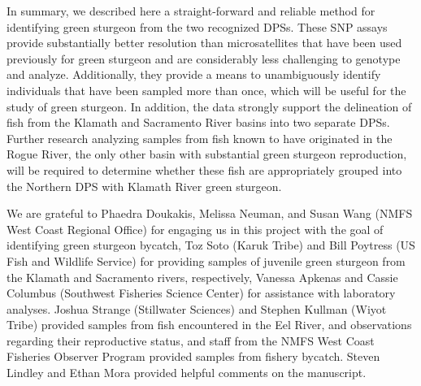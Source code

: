 In summary, we described here a straight-forward and reliable method for identifying
green sturgeon from the two recognized DPSs. These SNP assays provide substantially 
better resolution than microsatellites that have been used previously for green sturgeon \citep{Israeletal2009} 
and are considerably less challenging to genotype and analyze. 
Additionally, they provide a means to unambiguously identify individuals that have been 
sampled more than once, which will be useful for the study of green sturgeon. In addition, 
the data strongly support the delineation of fish from the Klamath and Sacramento River 
basins into two separate DPSs. Further research analyzing samples from fish known to have 
originated in the Rogue River, the only other basin with substantial green sturgeon 
reproduction, will be required to determine whether these fish are appropriately 
grouped into the Northern DPS with Klamath River green sturgeon. 









\begin{acknowledgements}
We are grateful to Phaedra Doukakis, Melissa Neuman, and Susan Wang (NMFS West Coast Regional Office) for engaging us in this project with the goal of identifying green sturgeon bycatch, Toz Soto (Karuk Tribe) and Bill Poytress (US Fish and Wildlife Service) for providing samples of juvenile green sturgeon from the Klamath and Sacramento rivers, respectively, Vanessa Apkenas and Cassie Columbus (Southwest Fisheries Science Center) for assistance with laboratory analyses. Joshua Strange (Stillwater Sciences) and Stephen Kullman (Wiyot Tribe) provided samples from fish encountered in the Eel River, and observations regarding their reproductive status, and staff from the NMFS West Coast Fisheries Observer Program provided samples from fishery bycatch. Steven Lindley and Ethan Mora provided helpful comments on the manuscript.
\end{acknowledgements}
